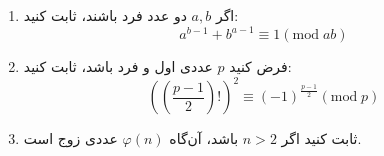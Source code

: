 \EXERCISE
\begin{enumerate}
\item
اگر
$a, b$
دو عدد فرد باشند، ثابت کنید:
$$a^{b-1} + b^{a-1} \equiv 1 (\mbox{mod}\;ab)$$
\item
فرض کنید
$p$
عددی اول و فرد باشد، ثابت کنید:
$$((\frac{p-1}{2})!)^2 \equiv (-1)^{\frac{p-1}{2}} (\mbox{mod}\;p)$$
\item
ثابت کنید اگر
$n > 2$
باشد، آن‌گاه
$\varphi(n)$
عددی زوج است.
\end{enumerate}